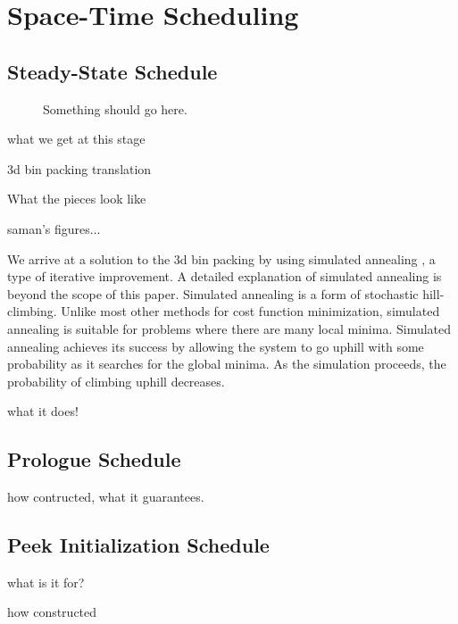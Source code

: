 \section{Space-Time Scheduling}
\label{sec:scheduling}
\subsection{Steady-State Schedule}

\begin{figure}
\centering
{}
\caption{Something should go here.
\protect\label{fig:1d}}
\end{figure}

what we get at this stage

3d bin packing translation

What the pieces look like 

saman's figures...

We arrive at a solution to the 3d bin packing by using simulated
annealing \cite{simanneal}, a type of iterative improvement.  A
detailed explanation of simulated annealing is beyond the scope of
this paper.  Simulated annealing is a form of stochastic
hill-climbing. Unlike most other methods for cost function
minimization, simulated annealing is suitable for problems where there
are many local minima.  Simulated annealing achieves its success by
allowing the system to go uphill with some probability as it searches
for the global minima.  As the simulation proceeds, the probability of
climbing uphill decreases.


what it does!

\subsection{Prologue Schedule}
how contructed, what it guarantees.

\subsection{Peek Initialization Schedule}
what is it for?

how constructed




